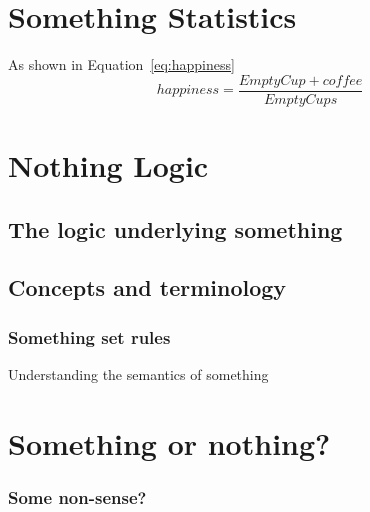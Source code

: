 \section{Something Statistics}
\label{sec:somestatistics}
	
As shown in Equation~\ref{eq:happiness}
\begin{equation}\label{eq:happiness}
	happiness=\frac{EmptyCup+coffee}{EmptyCups}
\end{equation}	
	
	
\section{Nothing Logic}
\label{sec:notlogic}
	
\subsection{The logic underlying something}
\label{subsec:logicunderlying}
    	
    	
    	
\subsection{Concepts and terminology}
\label{subsec:conceptsterm}	
		
\subsubsection*{Something set rules} 

Understanding the semantics of something

\section{Something or nothing?}
\label{sec:someornot}

\subsubsection*{Some non-sense?}

    	
    	
    	
    